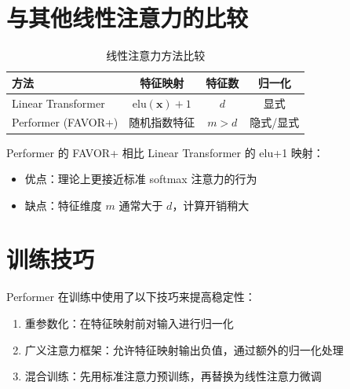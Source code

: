 \section{与其他线性注意力的比较}

\begin{table}[H]
    \centering
    \begin{tabular}{l|ccc}
        \toprule
        方法 & 特征映射 & 特征数 & 归一化 \\
        \midrule
        Linear Transformer & $\text{elu}(\mathbf{x}) + 1$ & $d$ & 显式 \\
        Performer (FAVOR+) & 随机指数特征 & $m > d$ & 隐式/显式 \\
        \bottomrule
    \end{tabular}
    \caption{线性注意力方法比较}
\end{table}

Performer 的 FAVOR+ 相比 Linear Transformer 的 elu+1 映射：

\begin{itemize}
    \item 优点：理论上更接近标准 softmax 注意力的行为
    \item 缺点：特征维度 $m$ 通常大于 $d$，计算开销稍大
\end{itemize}

\section{训练技巧}

Performer 在训练中使用了以下技巧来提高稳定性：

\begin{enumerate}
    \item 重参数化：在特征映射前对输入进行归一化
    \item 广义注意力框架：允许特征映射输出负值，通过额外的归一化处理
    \item 混合训练：先用标准注意力预训练，再替换为线性注意力微调
\end{enumerate}
